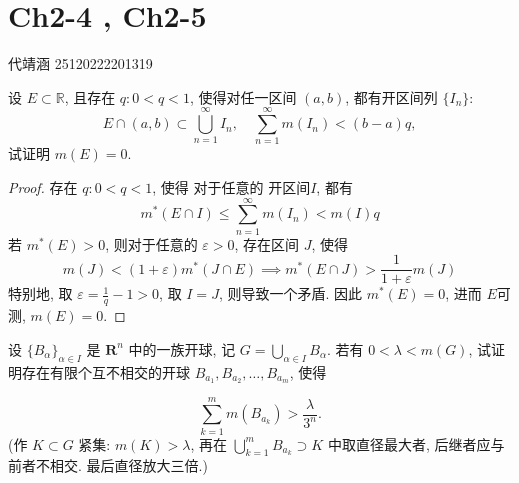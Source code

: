 \documentclass[../main.tex]{subfiles}
\begin{document}
\ifSubfilesClassLoaded{

    
    \setcounter{chapter}{1}
}{}

\chapter{ Ch2-4 , Ch2-5}
 代靖涵 25120222201319
\begin{exercise}{}{}
    设 $E \subset \mathbb{R}$, 且存在 $q: 0<q<1$, 使得对任一区间 $(a,b)$, 都有开区间列 $\{I_n\}$:
    \[
    E \cap (a,b) \subset \bigcup_{n=1}^{\infty} I_n, \quad \sum_{n=1}^{\infty} m(I_n) < (b-a)q,
    \]
    试证明 $m(E)=0$.
\end{exercise}
\begin{proof}
   存在 \(  q:0< q< 1  \), 使得 对于任意的 开区间\(  I  \), 都有 \[
   m^{*}\left( E\cap I \right)\le \sum _{n = 1}^{\infty}m\left( I_{n} \right)<   m\left( I \right)q  
   \] 若 \(  m^{*}\left( E \right)> 0   \),  则对于任意的 \(   \varepsilon > 0  \), 存在区间 \(  J  \), 使得 \[
   m\left( J \right)<  \left( 1+  \varepsilon  \right)m^{*}\left( J \cap E\right)   \implies m^{*}\left( E\cap J \right)>  \frac{1 }{1+  \varepsilon  }m\left( J \right)   
   \]  特别地, 取 \(   \varepsilon = \frac{1 }{q }-1> 0   \), 取 \(  I= J  \), 则导致一个矛盾.  因此 \(  m^{*}\left( E \right)= 0   \), 进而 \(  E  \)可测,  \(  m\left( E \right)= 0   \).   
\end{proof}
\begin{exercise}{}{}
    设 $\{B_\alpha\}_{\alpha \in I}$ 是 $\mathbf{R}^n$ 中的一族开球, 记 $G = \bigcup_{\alpha \in I} B_\alpha$. 若有 $0 < \lambda < m(G)$, 试证明存在有限个互不相交的开球 $B_{a_1}, B_{a_2}, \dots, B_{a_m}$, 使得

$$\sum_{k=1}^m m(B_{a_k}) > \frac{\lambda}{3^n}.$$
(作 $K \subset G$ 紧集: $m(K) > \lambda$, 再在 $\bigcup_{k=1}^m B_{a_k} \supset K$ 中取直径最大者, 后继者应与前者不相交. 最后直径放大三倍.)
\end{exercise}
\end{document}
